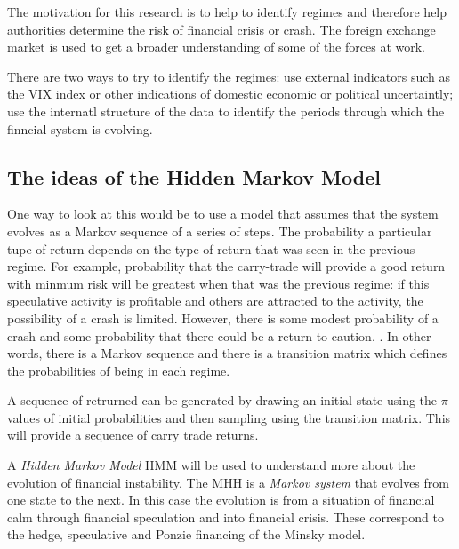 \documentclass[12pt, a4paper, oneside]{article} %
\begin{document}
The motivation for this research is to help to identify regimes and therefore help authorities determine the risk of financial crisis or crash. The foreign exchange market is used to get a broader understanding of some of the forces at work.

There are two ways to try to identify the regimes: use external indicators such as the VIX index or other indications of domestic economic or political uncertaintly; use the internatl structure of the data to identify the periods through which the finncial system  is evolving. 

\subsection{The ideas of the Hidden Markov Model}
One way to look at this would be to use a model that assumes that the system evolves as a Markov sequence of a series of steps.  The probability a particular tupe of return depends on the type of return that was seen in the previous regime.   For example, probability that the carry-trade will provide a good return with minmum risk will be greatest when that was the previous regime:  if this speculative activity is profitable and others are attracted to the activity, the possibility of a crash is limited.  However, there is some modest probability of a crash and some probability that there could be a return to caution. .  In other words, there is a Markov sequence and there is a transition matrix which defines the probabilities of being in each regime. 



A sequence of retrurned can be generated by drawing an initial state using the $\pi$ values of initial probabilities and then sampling using the transition matrix. This will provide a sequence of carry trade returns.   

A \emph{Hidden Markov Model} HMM will be used to understand more about the evolution of financial instability.  The MHH is a \emph{Markov system} that evolves from one state to the next.  In this case the evolution is from a situation of financial calm through financial speculation and into financial crisis.  These correspond to the hedge, speculative and Ponzie financing of the Minsky model.  
\end{document}
